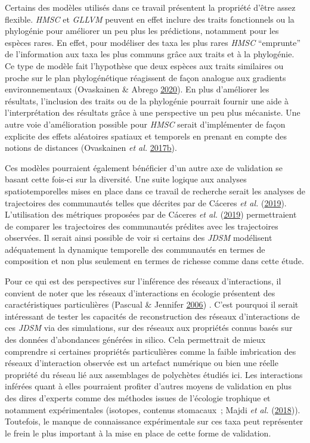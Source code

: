 \documentclass[12pt,]{article}
\begin{document}
Certains des modèles utilisés dans ce travail présentent la propriété
d'être assez flexible. \emph{HMSC} et \emph{GLLVM} peuvent en effet
inclure des traits fonctionnels ou la phylogénie pour améliorer un peu
plus les prédictions, notamment pour les espèces rares. En effet, pour
modéliser des taxa les plus rares \emph{HMSC} ``emprunte'' de
l'information aux taxa les plus communs grâce aux traits et à la
phylogénie. Ce type de modèle fait l'hypothèse que deux espèces aux
traits similaires ou proche sur le plan phylogénétique réagissent de
façon analogue aux gradients environnementaux (Ovaskainen \& Abrego
\protect\hyperlink{ref-Ovaskainen_2020}{2020}). En plus d'améliorer les
résultats, l'inclusion des traits ou de la phylogénie pourrait fournir
une aide à l'interprétation des résultats grâce à une perspective un peu
plus mécaniste. Une autre voie d'amélioration possible pour \emph{HMSC}
serait d'implémenter de façon explicite des effets aléatoires spatiaux
et temporels en prenant en compte des notions de distances (Ovaskainen
\emph{et al.}
\protect\hyperlink{ref-Ovaskainen_2017a}{2017}\protect\hyperlink{ref-Ovaskainen_2017a}{b}).

Ces modèles pourraient également bénéficier d'un autre axe de validation
se basant cette fois-ci sur la diversité. Une suite logique aux analyses
spatiotemporelles mises en place dans ce travail de recherche serait les
analyses de trajectoires des communautés telles que décrites par de
Cáceres \emph{et al.} (\protect\hyperlink{ref-De_Caceres_2019}{2019}).
L'utilisation des métriques proposées par de Cáceres \emph{et al.}
(\protect\hyperlink{ref-De_Caceres_2019}{2019}) permettraient de
comparer les trajectoires des communautés prédites avec les trajectoires
observées. Il serait ainsi possible de voir si certains des \emph{JDSM}
modélisent adéquatement la dynamique temporelle des communautés en
termes de composition et non plus seulement en termes de richesse comme
dans cette étude.

Pour ce qui est des perspectives sur l'inférence des réseaux
d'interactions, il convient de noter que les réseaux d'interactions en
écologie présentent des caractéristiques particulières (Pascual \&
Jennifer \protect\hyperlink{ref-Pascual_2006}{2006}) . C'est pourquoi il
serait intéressant de tester les capacités de reconstruction des réseaux
d'interactions de ces \emph{JDSM} via des simulations, sur des réseaux
aux propriétés connus basés sur des données d'abondances générées in
silico. Cela permettrait de mieux comprendre si certaines propriétés
particulières comme la faible imbrication des réseaux d'interaction
observée est un artefact numérique ou bien une réelle propriété du
réseau lié aux assemblages de polychètes étudiés ici. Les interactions
inférées quant à elles pourraient profiter d'autres moyens de validation
en plus des dires d'experts comme des méthodes issues de l'écologie
trophique et notamment expérimentales (isotopes, contenus stomacaux~;
Majdi \emph{et al.} (\protect\hyperlink{ref-Majdi_2018}{2018})).
Toutefois, le manque de connaissance expérimentale sur ces taxa peut
représenter le frein le plus important à la mise en place de cette forme
de validation.
\end{document}
